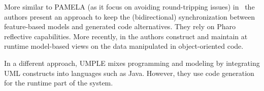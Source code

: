 More similar to PAMELA (as it focus on avoiding round-tripping issues) in~\cite{cavarle2016dynamic} the authors present an approach to keep the (bidirectional) synchronization between feature-based models and generated code alternatives. They rely on Pharo\cite{pharo} reflective capabilities. 
More recently, in \cite{boronat2019} the authors construct and maintain at runtime model-based views on the data manipulated in object-oriented code.



In a different approach, UMPLE\cite{lethbridge2016merging} mixes programming and modeling by integrating UML
constructs into languages such as Java. However, they use code generation for
the runtime part of the system.

